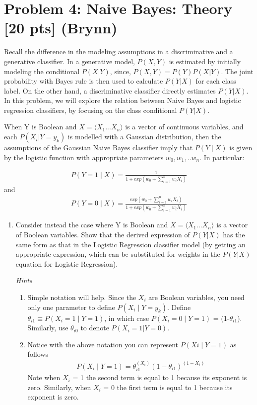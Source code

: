 \section*{Problem 4: Naive Bayes: Theory [20 pts] (Brynn)}

Recall the difference in the modeling assumptions in a discriminative and a generative classifier. In a generative model, $P(X,Y)$ is estimated by initially modeling the conditional $P(X|Y)$, since, $P(X,Y) = P(Y)P(X|Y)$. The joint probability with Bayes rule is then used to calculate $P(Y|X)$ for each class label. On the other hand, a discriminative classifier directly estimates $P(Y|X)$. In this problem, we will explore the relation between Naive Bayes and logistic regression classifiers, by focusing on the class conditional $P(Y|X)$.

When Y is Boolean and $X = \langle{X_{1}...X_{n}}\rangle$ is a vector of continuous variables, and each $P(X_i | Y= y_k)$ is modelled with a Gaussian distribution, then the assumptions of the Gaussian Naive Bayes classifier imply that $P(Y\mid{X})$ is given by the logistic function with
appropriate parameters $w_0, w_1, .. w_n$. In particular:

\begin{align*}
    P(Y=1\mid{X})=\frac{1}{1+exp(w_0+\sum_{i=1}^{n} w_iX_i)}
\end{align*}
and
\begin{align*}
    P(Y=0\mid{X})=\frac{exp(w_0+\sum_{i=1}^{n} w_iX_i)}{1+exp(w_0+\sum_{i=1}^{n} w_iX_i)}
\end{align*}

\begin{enumerate}
 
 
\item Consider instead the case where Y is Boolean and ${X = \langle{X_{1}...X_{n}}}\rangle$ is a vector of Boolean variables. Show that the derived expression of $P(Y|X)$ has the same form as that in the Logistic Regression classifier model (by getting an appropriate expression, which can be substituted for weights in the $P(Y|X)$ equation for Logistic Regression).


\emph{Hints}
\begin{enumerate}
    \item Simple notation will help. Since the $X_{i}$ are Boolean variables, you need only one parameter to define $P(X_{i}\mid{Y} = y_k)$. Define $\theta_{i1} \equiv P(X_{i} = 1\mid{Y = 1})$, in which case $P(X_{i} = 0\mid{Y = 1})$ = (1-$\theta_{i1}$). Similarly, use $\theta_{i0}$ to denote $P(X_{i} = 1|Y = 0)$.
    \item Notice with the above notation you can represent $P(Xi\mid{Y = 1})$ as follows
\begin{align*}
       P(X_{i}\mid{Y = 1}) = \theta_{i1}^{(X_i)}(1-\theta_{i1})^{(1-X_i)}
\end{align*}
    Note when $X_{i}$ = 1 the second term is equal to 1 because its exponent is zero. Similarly, when $X_{i}$ = 0 the first term is equal to 1 because its exponent is zero.
\end{enumerate}
\end{enumerate}

\newpage